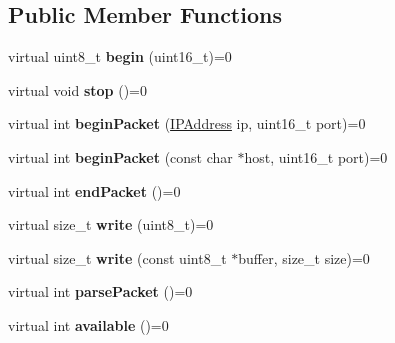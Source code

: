 \subsection*{Public Member Functions}
\begin{DoxyCompactItemize}
\item 
\hypertarget{class_u_d_p_aff8ceabeed84b50fd4eb7983c840b884}{virtual uint8\-\_\-t {\bfseries begin} (uint16\-\_\-t)=0}\label{class_u_d_p_aff8ceabeed84b50fd4eb7983c840b884}

\item 
\hypertarget{class_u_d_p_a0efff8623a2fb79dad94a96dcf16d966}{virtual void {\bfseries stop} ()=0}\label{class_u_d_p_a0efff8623a2fb79dad94a96dcf16d966}

\item 
\hypertarget{class_u_d_p_aca9cf7ebfd153f44bfad5b912f44f5ca}{virtual int {\bfseries begin\-Packet} (\hyperlink{class_i_p_address}{I\-P\-Address} ip, uint16\-\_\-t port)=0}\label{class_u_d_p_aca9cf7ebfd153f44bfad5b912f44f5ca}

\item 
\hypertarget{class_u_d_p_a4a10e98e9ab6f30d132d5f42367bc780}{virtual int {\bfseries begin\-Packet} (const char $\ast$host, uint16\-\_\-t port)=0}\label{class_u_d_p_a4a10e98e9ab6f30d132d5f42367bc780}

\item 
\hypertarget{class_u_d_p_a25f2388b1c8e90cf5ada1141c9c13dfb}{virtual int {\bfseries end\-Packet} ()=0}\label{class_u_d_p_a25f2388b1c8e90cf5ada1141c9c13dfb}

\item 
\hypertarget{class_u_d_p_acde4db2f92186810af3493fd2c7535f0}{virtual size\-\_\-t {\bfseries write} (uint8\-\_\-t)=0}\label{class_u_d_p_acde4db2f92186810af3493fd2c7535f0}

\item 
\hypertarget{class_u_d_p_acd93fd9e345711179a5a2af3d46b8b81}{virtual size\-\_\-t {\bfseries write} (const uint8\-\_\-t $\ast$buffer, size\-\_\-t size)=0}\label{class_u_d_p_acd93fd9e345711179a5a2af3d46b8b81}

\item 
\hypertarget{class_u_d_p_a581c4bc112e7598a08a79c322e2c038f}{virtual int {\bfseries parse\-Packet} ()=0}\label{class_u_d_p_a581c4bc112e7598a08a79c322e2c038f}

\item 
\hypertarget{class_u_d_p_aebd60457902debb30b07971a16f24ebd}{virtual int {\bfseries available} ()=0}\label{class_u_d_p_aebd60457902debb30b07971a16f24ebd}


\end{DoxyCompactItemize}
